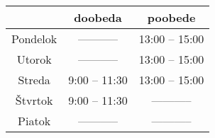 \begin{tabular}{|c|c|c|}
  \hline
                 &  doobeda    	  & poobede        \\
  \hline
  \hline
    Pondelok     & -----------    & 13:00 -- 15:00 \\
  \hline
    Utorok       & -----------    & 13:00 -- 15:00 \\
  \hline
    Streda       & 9:00 -- 11:30  & 13:00 -- 15:00 \\
  \hline
    Štvrtok      & 9:00 -- 11:30  & -----------    \\
  \hline
    Piatok       &   -----------  & -----------    \\
  \hline

\end{tabular}
